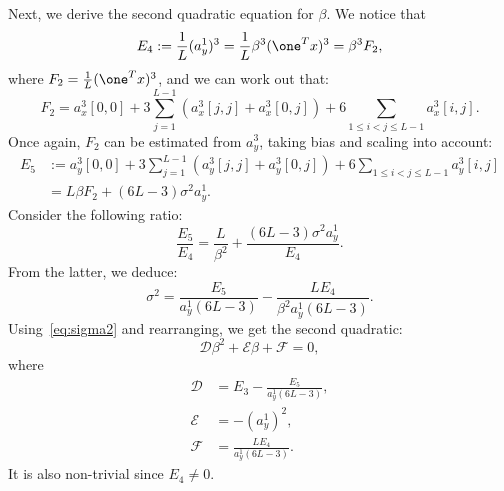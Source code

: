 \documentclass[9pt,twocolumn,twoside,lineno]{pnas-new}
\begin{document}
Next, we derive the second quadratic equation for $\beta$. We notice that 
\begin{equation} \label{eq:E3}
E_4 := \frac{1}{L}(a_y^1)^3 = \frac{1}{L}\beta^3 (\one ^Tx)^3   = \beta^3 F_2,
\end{equation}
where $F_2 = \frac{1}{L}(\one ^Tx)^3$, and we can work out that:
\begin{equation*}
F_2 = a_x^3[0,0] + 3\sum_{j=1}^{L-1} \left(a_x^3[j,j] + a_x^3[0,j]\right) + 6\sum_{1\leq i < j\leq L-1}a_x^3[i,j].
\end{equation*}
Once again, $F_2$ can be estimated from $a_y^3$, taking bias and scaling into account:
\begin{align}
	E_5 & := a_y^3[0,0] + 3\sum_{j=1}^{L-1} \left(a_y^3[j,j] + a_y^3[0,j]\right) + 6\sum_{1\leq i < j\leq L-1}a_y^3[i,j] \nonumber \\
		& = L \beta F_2 + (6L-3)\sigma^2a_y^1.
\end{align}
Consider the following ratio:
\begin{equation*} 
\frac{E_5}{E_4} = \frac{L}{\beta^2} + \frac{(6L-3)\sigma^2a_y^1}{E_4}.
\end{equation*}
From the latter, we deduce:
\begin{equation*}
\sigma^2 = \frac{E_5}{a_y^1(6L-3)}  - \frac{LE_4}{\beta^2a_y^1(6L-3)}.
\end{equation*}
Using~\eqref{eq:sigma2} and rearranging, we get the second quadratic:
\begin{equation} \label{eq:quad2}
\mathcal{D}\beta^2 + \mathcal{E}\beta + \mathcal{F} = 0,
\end{equation}
where
\begin{align*}
\mathcal{D} &= E_3 - \frac{E_5}{a_y^1(6L-3)}, \\ 
\mathcal{E} &= -(a_y^1)^2, \\
\mathcal{F} &= \frac{LE_4}{a_y^1(6L-3)}.
\end{align*}
It is also non-trivial since $E_4 \neq 0$.
\end{document}
